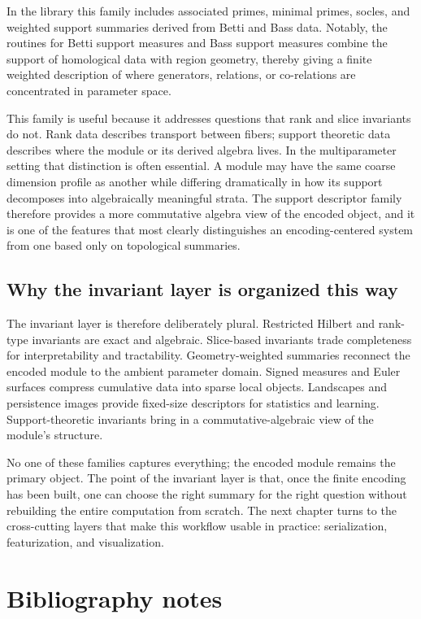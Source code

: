 \documentclass[11pt]{article}
\theoremstyle{definition}
\theoremstyle{remark}
\begin{document}
In the library this family includes associated primes, minimal primes, socles, and weighted support summaries derived from Betti and Bass data.  Notably, the routines for Betti support measures and Bass support measures combine the support of homological data with region geometry, thereby giving a finite weighted description of where generators, relations, or co-relations are concentrated in parameter space.

This family is useful because it addresses questions that rank and slice invariants do not.  Rank data describes transport between fibers; support theoretic data describes where the module or its derived algebra lives.  In the multiparameter setting that distinction is often essential.  A module may have the same coarse dimension profile as another while differing dramatically in how its support decomposes into algebraically meaningful strata.  The support descriptor family therefore provides a more commutative algebra view of the encoded object, and it is one of the features that most clearly distinguishes an encoding-centered system from one based only on topological summaries.

\subsection{Why the invariant layer is organized this way}

The invariant layer is therefore deliberately plural.  Restricted Hilbert and rank-type invariants are exact and algebraic.  Slice-based invariants trade completeness for interpretability and tractability.  Geometry-weighted summaries reconnect the encoded module to the ambient parameter domain.  Signed measures and Euler surfaces compress cumulative data into sparse local objects.  Landscapes and persistence images provide fixed-size descriptors for statistics and learning.  Support-theoretic invariants bring in a commutative-algebraic view of the module's structure.

No one of these families captures everything; the encoded module remains the primary object.  The point of the invariant layer is that, once the finite encoding has been built, one can choose the right summary for the right question without rebuilding the entire computation from scratch.  The next chapter turns to the cross-cutting layers that make this workflow usable in practice: serialization, featurization, and visualization.

\section{Bibliography notes}\label{app:bibliography-notes}
\end{document}
